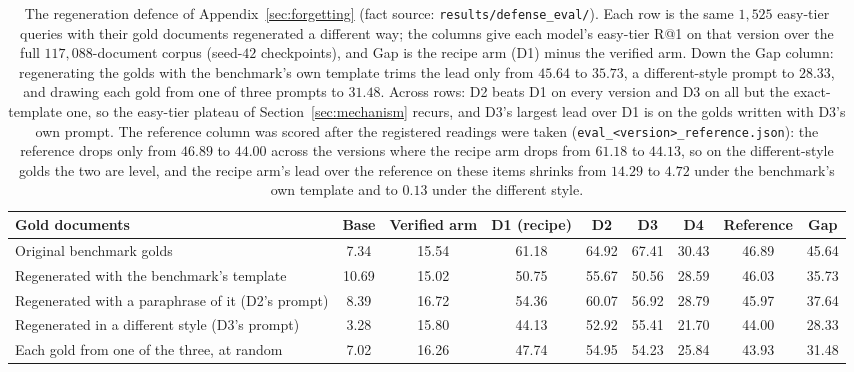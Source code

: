 \begin{table}[t]
\centering
\caption{The regeneration defence of Appendix~\ref{sec:forgetting} (fact source: \texttt{results/defense\_eval/}). Each row is the same $1{,}525$ easy-tier queries with their gold documents regenerated a different way; the columns give each model's easy-tier R@1 on that version over the full $117{,}088$-document corpus (seed-$42$ checkpoints), and Gap is the recipe arm (D1) minus the verified arm. Down the Gap column: regenerating the golds with the benchmark's own template trims the lead only from $45.64$ to $35.73$, a different-style prompt to $28.33$, and drawing each gold from one of three prompts to $31.48$. Across rows: D2 beats D1 on every version and D3 on all but the exact-template one, so the easy-tier plateau of Section~\ref{sec:mechanism} recurs, and D3's largest lead over D1 is on the golds written with D3's own prompt. The reference column was scored after the registered readings were taken (\texttt{eval\_<version>\_reference.json}): the reference drops only from $46.89$ to $44.00$ across the versions where the recipe arm drops from $61.18$ to $44.13$, so on the different-style golds the two are level, and the recipe arm's lead over the reference on these items shrinks from $14.29$ to $4.72$ under the benchmark's own template and to $0.13$ under the different style.}
\label{tab:defense}
\footnotesize
\setlength{\tabcolsep}{3pt}
\begin{tabular}{@{}>{\raggedright\arraybackslash}p{4.4cm}cccccccc@{}}
\toprule
Gold documents & Base & Verified arm & D1 (recipe) & D2 & D3 & D4 & Reference & Gap \\
\midrule
Original benchmark golds & 7.34 & 15.54 & 61.18 & 64.92 & 67.41 & 30.43 & 46.89 & 45.64 \\
Regenerated with the benchmark's template & 10.69 & 15.02 & 50.75 & 55.67 & 50.56 & 28.59 & 46.03 & 35.73 \\
Regenerated with a paraphrase of it (D2's prompt) & 8.39 & 16.72 & 54.36 & 60.07 & 56.92 & 28.79 & 45.97 & 37.64 \\
Regenerated in a different style (D3's prompt) & 3.28 & 15.80 & 44.13 & 52.92 & 55.41 & 21.70 & 44.00 & 28.33 \\
Each gold from one of the three, at random & 7.02 & 16.26 & 47.74 & 54.95 & 54.23 & 25.84 & 43.93 & 31.48 \\
\bottomrule
\end{tabular}
\end{table}

